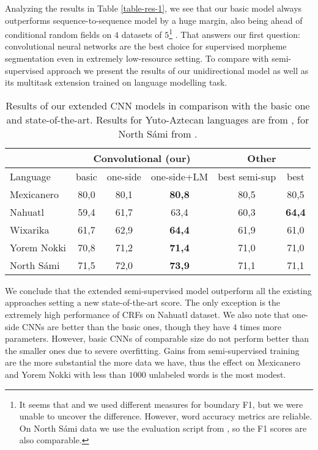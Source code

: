 \documentclass[11pt,a4paper]{article}
\begin{document}
Analyzing the results in Table \ref{table-res-1}, we see that our basic model always outperforms sequence-to-sequence model by a huge margin, also being ahead of conditional random fields on $4$ datasets of $5$\footnote{It seems that  and we used different measures for boundary F1, but we were unable to uncover the difference. However, word accuracy metrics are reliable. On North S\'ami data we use the evaluation script from , so the F1 scores are also comparable.} . That answers our first question: convolutional neural networks are the best choice for supervised morpheme segmentation even in extremely low-resource setting. To compare with semi-supervised approach we present the results of our unidirectional model as well as its multitask extension trained on language modelling task.

\begin{table*}[h!]
	\centering
	\begin{tabular}{|l|ccc|cc|}
		\hline
		& \multicolumn{3}{|c|}{Convolutional (our)} & \multicolumn{2}{|c|}{Other} \\
		\hline
		Language & basic & one-side & one-side+LM & best semi-sup & best \\
		\hline
		Mexicanero & 80,0 & 80,1 & \textbf{80,8} & 80,5 & 80,5 \\
		Nahuatl & 59,4	& 61,7 & 63,4 & 60,3 & \textbf{64,4} \\
		Wixarika & 61,7 & 62,9 & \textbf{64,4} & 61,9 & 61,0 \\
		Yorem Nokki & 70,8 & 71,2 & \textbf{71,4} & 71,0 & 71,0 \\
		\hline
		North S\'ami & 71,5 & 72,0 & \textbf{73,9} & 71,1 & 71,1 \\
		\hline 
	\end{tabular}
	\caption{Results of our extended CNN models in comparison with the basic one and state-of-the-art. Results for Yuto-Aztecan languages are from , for North S\'ami from .}\label{table-res-2}
\end{table*} 

We conclude that the extended semi-supervised model outperform all the existing approaches setting a new state-of-the-art score. The only exception is the extremely high performance of CRFs on Nahuatl dataset. We also note that one-side CNNs are better than the basic ones, though they have $4$ times more parameters. However, basic CNNs of comparable size do not perform better than the smaller ones due to severe overfitting. Gains from semi-supervised training are the more substantial the more data we have, thus the effect on Mexicanero and Yorem Nokki with less than $1000$ unlabeled words is the most modest.
\end{document}
